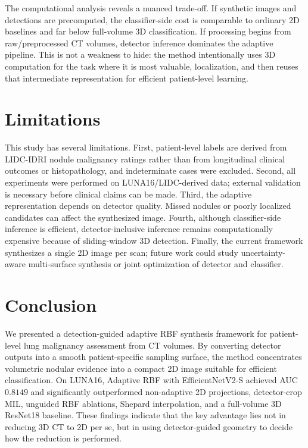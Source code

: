 \documentclass[preprint,12pt]{elsarticle}
\begin{document}
The computational analysis reveals a nuanced trade-off. If synthetic images and detections are precomputed, the classifier-side cost is comparable to ordinary 2D baselines and far below full-volume 3D classification. If processing begins from raw/preprocessed CT volumes, detector inference dominates the adaptive pipeline. This is not a weakness to hide: the method intentionally uses 3D computation for the task where it is most valuable, localization, and then reuses that intermediate representation for efficient patient-level learning.

\section{Limitations}

This study has several limitations. First, patient-level labels are derived from LIDC-IDRI nodule malignancy ratings rather than from longitudinal clinical outcomes or histopathology, and indeterminate cases were excluded. Second, all experiments were performed on LUNA16/LIDC-derived data; external validation is necessary before clinical claims can be made. Third, the adaptive representation depends on detector quality. Missed nodules or poorly localized candidates can affect the synthesized image. Fourth, although classifier-side inference is efficient, detector-inclusive inference remains computationally expensive because of sliding-window 3D detection. Finally, the current framework synthesizes a single 2D image per scan; future work could study uncertainty-aware multi-surface synthesis or joint optimization of detector and classifier.

\section{Conclusion}

We presented a detection-guided adaptive RBF synthesis framework for patient-level lung malignancy assessment from CT volumes. By converting detector outputs into a smooth patient-specific sampling surface, the method concentrates volumetric nodular evidence into a compact 2D image suitable for efficient classification. On LUNA16, Adaptive RBF with EfficientNetV2-S achieved AUC $0.8149$ and significantly outperformed non-adaptive 2D projections, detector-crop MIL, unguided RBF ablations, Shepard interpolation, and a full-volume 3D ResNet18 baseline. These findings indicate that the key advantage lies not in reducing 3D CT to 2D per se, but in using detector-guided geometry to decide how the reduction is performed.
\end{document}

